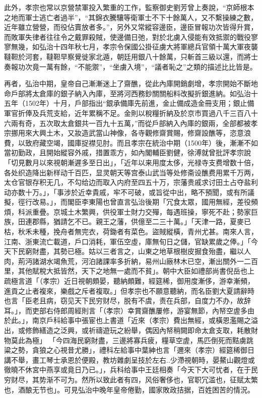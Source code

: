 此外，孝宗也常以京營禁軍投入繁重的工作，監察御史劉芳曾上奏說，“京師根本之地而軍士逃亡者過半”，“其錦衣騰驤等衛軍士不下十餘萬人，又不繫操練之數，近年雖立營營，而役佔賣放者多。”，另外又常縱容邊臣，邊臣冒報功次皆得升賞，而敗軍失律者往往令之戴罪殺賊，使邊備日弛，對於北虜入侵能有效抵禦的戰役寥寥無幾，如弘治十四年秋七月，孝宗令保國公掛征虜大將軍總兵官領十萬大軍夜襲韃靼於河套，韃靼早察覺徙家北遁，朝廷用銀八十餘萬，只斬首三級以還，而將士奏報功次竟一萬有餘，“不能禦”，“坐虜入境”，“議者恥之”之類的描述比比皆是。

再者，弘治中期，皇帝自己漸漸迷上了齋醮，從此內庫開銷劇增，孝宗開始不斷地命戶部將太倉庫的銀子納入內庫，至將河西務鈔關關船料改擬折銀進納。如弘治十五年（1502年）十月，戶部指出“銀承備庫先前進，金止備成造金冊支用；銀止備軍官折俸及兵荒支給，近年累稱不足。金則以稅糧折納及於京市買過八千三百八十六兩有奇，五次取太倉銀共一百九十五萬，”而從戶部納入內庫的銀兩，全部都被孝宗挪用來大興土木，又妝造武當山神像，各寺觀修齋賞賜，修齋設醮等，恣意浪費，以致府藏空竭，國庫捉襟见肘。而且孝宗在統治中期（1500年）後，漸漸不如當初勤政，且開始縱容外戚，措置乖方，如內閣輔臣劉健，徐溥就曾批評孝宗說「切見數月以來視朝漸遲多至日出」，「近年以来用度太侈，光禄寺支费增数十倍，各处织造降出新样动千百匹，显灵朝天等宫泰山武当等处修斋设醮费用累千万两，太仓官银存积无几，不勾给边而取入内府至四五十万，宗藩贵戚求讨田土占夺盐利动亦数十万。」，「事涉於近幸貴戚，牢不可破，或旨從中出，略不預聞，或有所議擬，徑行改易。」，而閣臣李東陽也曾直言弘治後期「冗食太眾，國用無經，差役頻煩，科派重疊。京城土木繁興，供役軍士財力交殫，每遇班操，寧死不赴；勢家巨族，田連郡縣，猶請乞不已。親王之藩，供億至二三十萬。」「天津一路，夏麥已枯，秋禾未種，挽舟者無完衣，荷鋤者有菜色。盜賊縱橫，青州尤甚。南來人言，江南、浙東流亡載道，戶口消耗，軍伍空虛，庫無旬日之儲，官缺累歲之俸。」「今天下民窮財盡，其勢已極。姑以三者言之，山東之地草根樹皮掘食殆盡，繼以人肉，荊沔諸湖水竭魚荒，河泊諸課率多折納，易州山廠林木已空，漸出關外一二百里，其他賦稅大抵皆然，天下之地無一處而不貧」。朝中大臣如禮部尚書倪岳也上疏極言道「（孝宗）近日視朝頗晏，聽納頗難，經筵稀，御用度漸侈，游幸漸頻，進貢之止者複來，樂戲之斥者複取。」但孝宗也不願意聽納，而名臣劉大夏請辭時也言「臣老且病，窃见天下民穷财尽，脱有不虞，责在兵部，自度力不办，故辞耳。」，而吏部右侍郎周經則言「（孝宗）幸賞齋醮屢修，游宴無節，內帑空虗多由於此。」，南京戶科給事中張宦也上書道「近來（孝宗）費出無經，或橫恩濫賜之溢出，或修飾繕造之泛興，或祈禱遊玩之紛舉，偶因內帑稍闕即命太倉支取，耗散財物莫此為極」 「今四海民窮財盡，三邊將寡兵疲，糧草空虗，馬匹倒死而黠虜跳粱之勢，貪狼之心視昔尤勝」，禮科左給事中葉紳也言「邇來（孝宗）經筵稀御日講不舉，畫工琴士承恩於便殿，教坊雜劇呈技於左右..少滯視朝時，晏鰲山觀燈或徹曉不休宮中燕享或竟日乃已。」，兵科给事中王廷相奏「今天下大可忧者，在于民穷财尽，其势渐不可为。然所以致此者有四，风俗奢侈也，官职冗滥也，征赋太繁也，酒酿无节也」。可見弘治中晚年皇帝倦勤，國家敗政拮据，百姓困苦的情況。

